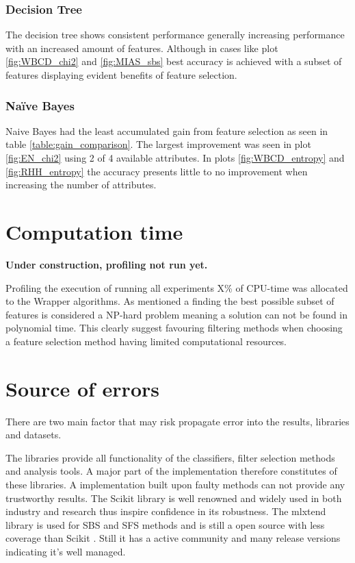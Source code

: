 \subsubsection{Decision Tree}

The decision tree shows consistent performance generally increasing performance with an increased amount of features. Although in cases like plot \ref{fig:WBCD_chi2} and \ref{fig:MIAS_sbs} best accuracy is achieved with a subset of features displaying evident benefits of feature selection.

\subsubsection{Naïve Bayes}

Naive Bayes had the least accumulated gain from feature selection as seen in table \ref{table:gain_comparison}. The largest improvement was seen in plot \ref{fig:EN_chi2} using 2 of 4 available attributes. In plots \ref{fig:WBCD_entropy} and \ref{fig:RHH_entropy} the accuracy presents little to no improvement when increasing the number of attributes.






\newpage
\section{Computation time}

\textbf{Under construction, profiling not run yet.}

Profiling the execution of running all experiments X\% of CPU-time was allocated to the Wrapper algorithms. As mentioned a finding the best possible subset of features is considered a NP-hard problem meaning a solution can not be found in polynomial time. This clearly suggest favouring filtering methods when choosing a feature selection method having limited computational resources.

\section{Source of errors}
\label{sec:source_of_errors}

There are two main factor that may risk propagate error into the results, libraries and datasets.

The libraries provide all functionality of the classifiers, filter selection methods and analysis tools. A major part of the implementation therefore constitutes of these libraries. A implementation built upon faulty methods can not provide any trustworthy results. The Scikit library \parencite{scikit-learn} is well renowned and widely used in both industry and research thus inspire confidence in its robustness. The mlxtend library is used for SBS and SFS methods and is still a open source with less coverage than Scikit \parencite{mlextend}. Still it has a active community and many release versions indicating it's well managed.


